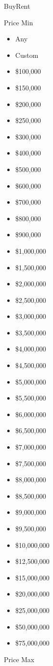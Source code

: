 BuyRent

Price Min

\begin{itemize}
\tightlist
\item
  Any
\item
  Custom
\item
  \$100,000
\item
  \$150,000
\item
  \$200,000
\item
  \$250,000
\item
  \$300,000
\item
  \$400,000
\item
  \$500,000
\item
  \$600,000
\item
  \$700,000
\item
  \$800,000
\item
  \$900,000
\item
  \$1,000,000
\item
  \$1,500,000
\item
  \$2,000,000
\item
  \$2,500,000
\item
  \$3,000,000
\item
  \$3,500,000
\item
  \$4,000,000
\item
  \$4,500,000
\item
  \$5,000,000
\item
  \$5,500,000
\item
  \$6,000,000
\item
  \$6,500,000
\item
  \$7,000,000
\item
  \$7,500,000
\item
  \$8,000,000
\item
  \$8,500,000
\item
  \$9,000,000
\item
  \$9,500,000
\item
  \$10,000,000
\item
  \$12,500,000
\item
  \$15,000,000
\item
  \$20,000,000
\item
  \$25,000,000
\item
  \$50,000,000
\item
  \$75,000,000
\end{itemize}

Price Max

